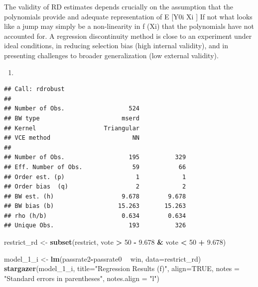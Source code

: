 \documentclass[
  12pt,
  landscape]{article}
\newenvironment{Shaded}{\begin{snugshade}}{\end{snugshade}}
\newcommand{\DataTypeTok}[1]{\textcolor[rgb]{0.13,0.29,0.53}{#1}}
\newcommand{\DecValTok}[1]{\textcolor[rgb]{0.00,0.00,0.81}{#1}}
\newcommand{\FloatTok}[1]{\textcolor[rgb]{0.00,0.00,0.81}{#1}}
\newcommand{\KeywordTok}[1]{\textcolor[rgb]{0.13,0.29,0.53}{\textbf{#1}}}
\newcommand{\NormalTok}[1]{#1}
\newcommand{\OperatorTok}[1]{\textcolor[rgb]{0.81,0.36,0.00}{\textbf{#1}}}
\newcommand{\OtherTok}[1]{\textcolor[rgb]{0.56,0.35,0.01}{#1}}
\newcommand{\StringTok}[1]{\textcolor[rgb]{0.31,0.60,0.02}{#1}}
\begin{document}
The validity of RD estimates depends crucially on the assumption that
the polynomials provide and adequate representation of E {[}Y0i
\textbar{} Xi {]} If not what looks like a jump may simply be a
non-linearity in f (Xi) that the polynomials have not accounted for. A
regression discontinuity method is close to an experiment under ideal
conditions, in reducing selection bias (high internal validity), and in
presenting challenges to broader generalization (low external validity).

\begin{enumerate}
\def\labelenumi{(\roman{enumi})}
\item
\end{enumerate}

\begin{Shaded}
\end{Shaded}

\begin{verbatim}
## Call: rdrobust
## 
## Number of Obs.                  524
## BW type                       mserd
## Kernel                   Triangular
## VCE method                       NN
## 
## Number of Obs.                  195          329
## Eff. Number of Obs.              59           66
## Order est. (p)                    1            1
## Order bias  (q)                   2            2
## BW est. (h)                   9.678        9.678
## BW bias (b)                  15.263       15.263
## rho (h/b)                     0.634        0.634
## Unique Obs.                     193          326
\end{verbatim}

\begin{Shaded}
\begin{Highlighting}[]
\NormalTok{restrict_rd <-}\StringTok{ }\KeywordTok{subset}\NormalTok{(restrict, vote }\OperatorTok{>}\StringTok{ }\DecValTok{50} \OperatorTok{-}\StringTok{ }\FloatTok{9.678} \OperatorTok{&}\StringTok{ }\NormalTok{vote }\OperatorTok{<}\StringTok{ }\DecValTok{50} \OperatorTok{+}\StringTok{ }\FloatTok{9.678}\NormalTok{)}

\NormalTok{model_}\DecValTok{1}\NormalTok{_i <-}\StringTok{ }\KeywordTok{lm}\NormalTok{(passrate2}\OperatorTok{-}\NormalTok{passrate0 }\OperatorTok{~}\StringTok{ }\NormalTok{win, }\DataTypeTok{data=}\NormalTok{restrict_rd)}
\KeywordTok{stargazer}\NormalTok{(model_}\DecValTok{1}\NormalTok{_i, }\DataTypeTok{title=}\StringTok{"Regression Results (f)"}\NormalTok{, }\DataTypeTok{align=}\OtherTok{TRUE}\NormalTok{, }\DataTypeTok{notes =} \StringTok{"Standard errors in parentheses"}\NormalTok{, }\DataTypeTok{notes.align =} \StringTok{"l"}\NormalTok{)}
\end{Highlighting}
\end{Shaded}
\end{document}
